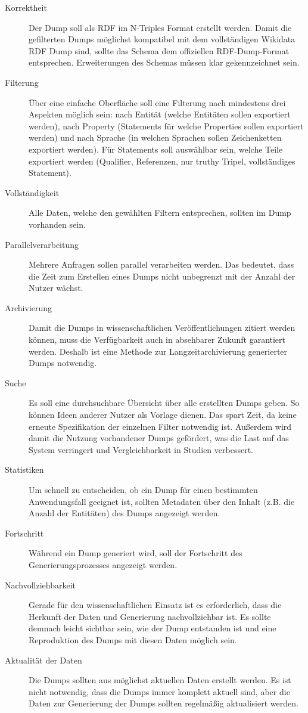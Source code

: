 \begin{description}
  \item[Korrektheit] Der Dump soll als RDF im N-Triples Format erstellt werden. Damit die gefilterten Dumps möglichst kompatibel mit dem vollständigen Wikidata RDF Dump sind, sollte das Schema dem offiziellen RDF-Dump-Format entsprechen. Erweiterungen des Schemas müssen klar gekennzeichnet sein.
  \item[Filterung] Über eine einfache Oberfläche soll eine Filterung nach mindestens drei Aspekten möglich sein: nach Entität (welche Entitäten sollen exportiert werden), nach Property (Statements für welche Properties sollen exportiert werden) und nach Sprache (in welchen Sprachen sollen Zeichenketten exportiert werden). Für Statements soll auswählbar sein, welche Teile exportiert werden (Qualifier, Referenzen, nur truthy Tripel, vollständiges Statement).
  \item[Vollständigkeit] Alle Daten, welche den gewählten Filtern entsprechen, sollten im Dump vorhanden sein. 
  \item[Parallelverarbeitung] Mehrere Anfragen sollen parallel verarbeiten werden. Das bedeutet, dass die Zeit zum Erstellen eines Dumps nicht unbegrenzt mit der Anzahl der Nutzer wächst.
  \item[Archivierung] Damit die Dumps in wissenschaftlichen Veröffentlichungen zitiert werden können, muss die Verfügbarkeit auch in absehbarer Zukunft garantiert werden. Deshalb ist eine Methode zur Langzeitarchivierung generierter Dumps notwendig. 
  \item[Suche] Es soll eine durchsuchbare Übersicht über alle erstellten Dumps geben.
    So können Ideen anderer Nutzer als Vorlage dienen. Das spart Zeit, da keine erneute Spezifikation der einzelnen Filter notwendig ist. Außerdem wird damit die Nutzung vorhandener Dumps gefördert, was die Last auf das System verringert und Vergleichbarkeit in Studien verbessert.
  \item[Statistiken] Um schnell zu entscheiden, ob ein Dump für einen bestimmten Anwendungsfall geeignet ist, sollten Metadaten über den Inhalt (z.B. die Anzahl der Entitäten) des Dumps angezeigt werden. 
  \item[Fortschritt] Während ein Dump generiert wird, soll der Fortschritt des Generierungsprozesses angezeigt werden.
  \item[Nachvollziehbarkeit] Gerade für den wissenschaftlichen Einsatz ist es erforderlich, dass die Herkunft der Daten und Generierung nachvollziehbar ist.
    Es sollte demnach leicht sichtbar sein, wie der Dump entstanden ist und eine Reproduktion des Dumps mit diesen Daten möglich sein. 
  \item[Aktualität der Daten] Die Dumps sollten aus möglichst aktuellen Daten erstellt werden.
    Es ist nicht notwendig, dass die Dumps immer komplett aktuell sind, aber die Daten zur Generierung der Dumps sollten regelmäßig aktualisiert werden.
\end{description}

